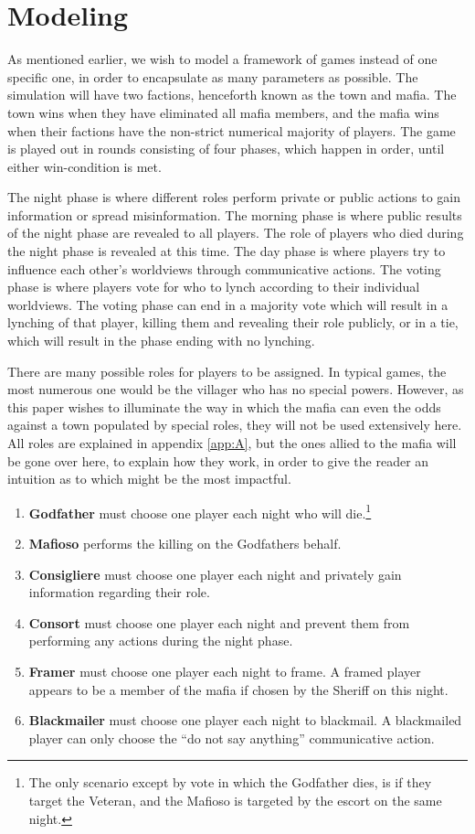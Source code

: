 \section{Modeling}
As mentioned earlier, we wish to model a framework of games instead of one
specific one, in order to encapsulate as many parameters as possible. The simulation will have two factions, henceforth known as the town and
mafia. The town wins when they have eliminated all mafia members, and the mafia
wins when their factions have the non-strict numerical majority of players. The
game is played out in rounds consisting of four phases, which happen in order,
until either win-condition is met.

The night phase is where different roles perform private or public actions to
gain information or spread misinformation. The morning phase is where public
results of the night phase are revealed to all players. The role of players who
died during the night phase is revealed at this time. The day phase is where
players try to influence each other's worldviews through communicative actions.
The voting phase is where players vote for who to lynch according to their
individual worldviews. The voting phase can end in a majority vote which will
result in a lynching of that player, killing them and revealing their role
publicly, or in a tie, which will result in the phase ending with no lynching.

There are many possible roles for players to be assigned. In typical games, the
most numerous one would be the villager who has no special powers. However, as
this paper wishes to illuminate the way in which the mafia can even the odds
against a town populated by special roles, they will not be used extensively
here. All roles are explained in appendix \ref{app:A}, but the ones allied to
the mafia will be gone over here, to explain how they work, in order to give
the reader an intuition as to which might be the most impactful.

\begin{enumerate}
	\item\textbf{Godfather} must choose one player each night who will die.\footnote{The only scenario except by vote in which the Godfather dies, is if they target the Veteran, and the Mafioso is targeted by the escort on the same night.}
	\item\textbf{Mafioso} performs the killing on the Godfathers behalf.
	\item\textbf{Consigliere} must choose one player each night and privately
	      gain information regarding their role.
	\item\textbf{Consort} must choose one player each night and prevent them
	      from performing any actions during the night phase.
	\item\textbf{Framer} must choose one player each night to frame. A framed
	      player appears to be a member of the mafia if chosen by the Sheriff on this
	      night.
	\item\textbf{Blackmailer} must choose one player each night to blackmail. A
	      blackmailed player can only choose the “do not say anything” communicative
	      action.
\end{enumerate}

